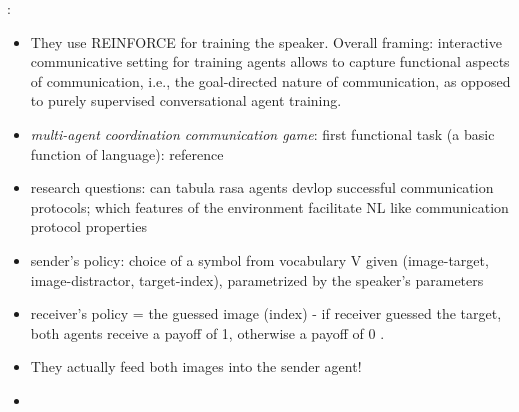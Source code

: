 \cite{lazaridou2016multi}:
\begin{itemize}
	\item They use REINFORCE for training the speaker. Overall framing: interactive communicative setting for training agents allows to capture functional aspects of communication, i.e., the goal-directed nature of communication, as opposed to purely supervised conversational agent training. 
	\item \textit{multi-agent coordination communication game}: first functional task (a basic function of language): reference
	\item research questions: can tabula rasa agents devlop successful communication protocols; which features of the environment facilitate NL like communication protocol properties
	\item  sender's policy: choice of a symbol from vocabulary V given (image-target, image-distractor, target-index), parametrized by the speaker's parameters
	\item receiver's policy = the guessed image (index) - if receiver guessed the target, both agents receive a payoff of 1, otherwise a payoff of 0 .
	\item They actually feed both images into the sender agent!
	\item {}

\end{itemize}
